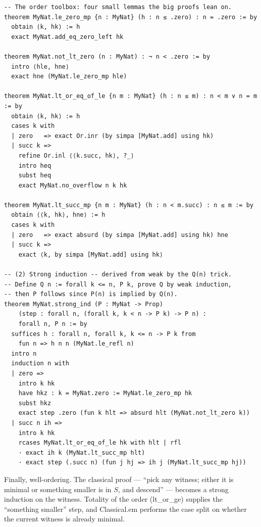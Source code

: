 \documentclass[12pt, openany]{book}
\theoremstyle{plain}
\theoremstyle{definition}
\theoremstyle{remark}
\newcommand{\li}[1]{{\ttfamily\small\color{tealaccent}#1}}
\begin{document}
\begin{leanbox}
\begin{lstlisting}
-- The order toolbox: four small lemmas the big proofs lean on.
theorem MyNat.le_zero_mp {n : MyNat} (h : n ≤ .zero) : n = .zero := by
  obtain ⟨k, hk⟩ := h
  exact MyNat.add_eq_zero_left hk

theorem MyNat.not_lt_zero (n : MyNat) : ¬ n < .zero := by
  intro ⟨hle, hne⟩
  exact hne (MyNat.le_zero_mp hle)

theorem MyNat.lt_or_eq_of_le {n m : MyNat} (h : n ≤ m) : n < m ∨ n = m := by
  obtain ⟨k, hk⟩ := h
  cases k with
  | zero   => exact Or.inr (by simpa [MyNat.add] using hk)
  | succ k =>
    refine Or.inl ⟨⟨k.succ, hk⟩, ?_⟩
    intro heq
    subst heq
    exact MyNat.no_overflow n k hk

theorem MyNat.lt_succ_mp {n m : MyNat} (h : n < m.succ) : n ≤ m := by
  obtain ⟨⟨k, hk⟩, hne⟩ := h
  cases k with
  | zero   => exact absurd (by simpa [MyNat.add] using hk) hne
  | succ k =>
    exact ⟨k, by simpa [MyNat.add] using hk⟩

-- (2) Strong induction -- derived from weak by the Q(n) trick.
-- Define Q n := forall k <= n, P k, prove Q by weak induction,
-- then P follows since P(n) is implied by Q(n).
theorem MyNat.strong_ind (P : MyNat -> Prop)
    (step : forall n, (forall k, k < n -> P k) -> P n) :
    forall n, P n := by
  suffices h : forall n, forall k, k <= n -> P k from
    fun n => h n n (MyNat.le_refl n)
  intro n
  induction n with
  | zero =>
    intro k hk
    have hkz : k = MyNat.zero := MyNat.le_zero_mp hk
    subst hkz
    exact step .zero (fun k hlt => absurd hlt (MyNat.not_lt_zero k))
  | succ n ih =>
    intro k hk
    rcases MyNat.lt_or_eq_of_le hk with hlt | rfl
    · exact ih k (MyNat.lt_succ_mp hlt)
    · exact step (.succ n) (fun j hj => ih j (MyNat.lt_succ_mp hj))
\end{lstlisting}
\end{leanbox}
\color{black}

Finally, well-ordering.  The classical proof --- ``pick any witness; either it is minimal or something smaller is in $S$, and descend'' --- becomes a strong induction on the witness.  Totality of the order (\li{lt\_or\_ge}) supplies the ``something smaller'' step, and \li{Classical.em} performs the case split on whether the current witness is already minimal.
\end{document}
